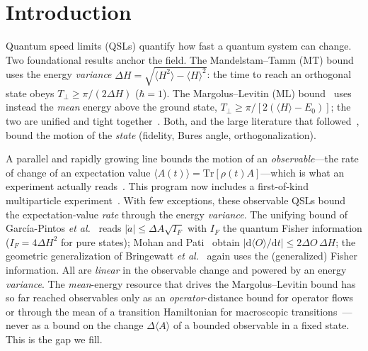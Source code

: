 \documentclass[aps,pra,twocolumn,superscriptaddress,nofootinbib,longbibliography]{revtex4-2}
\newcommand{\mean}[1]{\langle #1 \rangle}
\newcommand{\Tr}{\mathrm{Tr}}
\begin{document}
\maketitle

\section{Introduction}
Quantum speed limits (QSLs) quantify how fast a quantum system can change. Two foundational results anchor
the field. The Mandelstam--Tamm (MT) bound~\cite{MandelstamTamm1945} uses the energy \emph{variance}
$\Delta H=\sqrt{\mean{H^2}-\mean{H}^2}$: the time to reach an orthogonal state obeys
$T_\perp\ge \pi/(2\Delta H)$ ($\hbar=1$). The Margolus--Levitin (ML) bound~\cite{MargolusLevitin1998} uses
instead the \emph{mean} energy above the ground state, $T_\perp\ge \pi/[2(\mean{H}-E_0)]$; the two are
unified and tight together~\cite{LevitinToffoli2009}. Both, and the large literature that
followed~\cite{DeffnerCampbell2017}, bound the motion of the \emph{state} (fidelity, Bures angle,
orthogonalization).

A parallel and rapidly growing line bounds the motion of an \emph{observable}---the rate of change of an
expectation value $\mean{A(t)}=\Tr[\rho(t)A]$---which is what an experiment actually
reads~\cite{GarciaPintos2022UnifyingObservables,mohan2022quantum,Bringewatt2024GeneralizedGeometric,Carabba2022operatorflows,Cafaro2026FluctuationGrowth}.
This program now includes a first-of-kind multiparticle experiment~\cite{Miao2025Experiment}. With few
exceptions, these observable QSLs bound the expectation-value \emph{rate} through the energy \emph{variance}.
The unifying bound of García-Pintos \emph{et al.}~\cite{GarciaPintos2022UnifyingObservables} reads
$|\dot a|\le \Delta A\sqrt{I_F}$ with $I_F$ the quantum Fisher information ($I_F=4\Delta H^2$ for pure
states); Mohan and Pati~\cite{mohan2022quantum} obtain $|\mathrm d\mean{O}/\mathrm dt|\le 2\Delta O\,\Delta H$;
the geometric generalization of Bringewatt \emph{et al.}~\cite{Bringewatt2024GeneralizedGeometric} again
uses the (generalized) Fisher information. All are \emph{linear} in the observable change and powered by an
energy \emph{variance}. The \emph{mean}-energy resource that drives the Margolus--Levitin bound has so far
reached observables only as an \emph{operator}-distance bound for operator
flows~\cite{Carabba2022operatorflows} or through the mean of a transition Hamiltonian for macroscopic
transitions~\cite{Hamazaki2022SpeedLimits}---never as a bound on the change $\Delta\mean{A}$ of a bounded
observable in a fixed state. This is the gap we fill.
\end{document}
